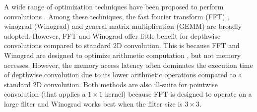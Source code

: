 A wide range of optimization techniques have been proposed to perform convolutions
\cite{Zhen2018Optimizing,liu2019optimizing,winter2019adaptive,li2019autofft,yan2020optimizing,Vasudevan2017Parallel,li2019coordinated,wu2020ugemm}.
Among these techniques, the fast fourier transform (FFT) \cite{li2019autofft}, winograd (Winograd) \cite{yan2020optimizing} and general
matrix multiplication (GEMM) \cite{Vasudevan2017Parallel,li2019coordinated,wu2020ugemm} are broadly adopted. However, FFT and Winograd offer little
benefit for depthwise convolutions compared to standard 2D convolution. This is because FFT and Winograd are designed to optimize
arithmetic computation \cite{zlateski2019anatomy,yan2020optimizing}, but not memory accesses. However, the memory access latency often dominates the execution time of
depthwise convolution \cite{cudaperformance} due to its lower arithmetic operations compared to a standard 2D convolution.  Both methods
are also ill-suite for pointwise convolution (that applies a $1 \times 1$ kernel) because FFT is designed to operate on a large filter and
Winograd works best when the filter size is $3 \times 3$.



